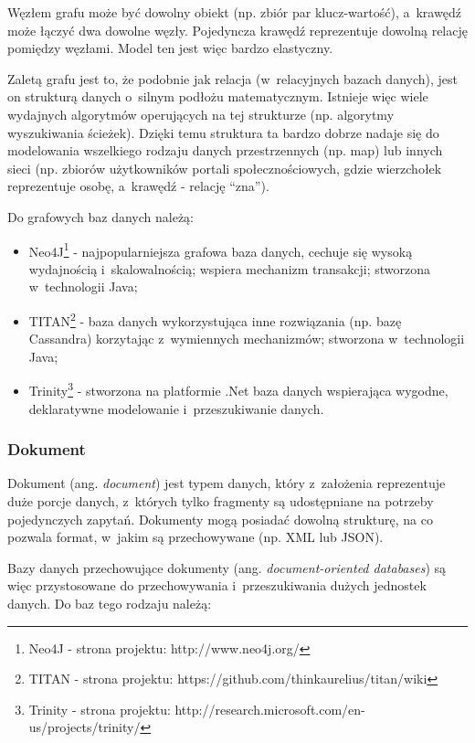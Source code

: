 Węzłem grafu może być dowolny obiekt (np. zbiór par klucz-wartość), a~krawędź może łączyć dwa dowolne węzły.
Pojedyncza krawędź reprezentuje dowolną relację pomiędzy węzłami.
Model ten jest więc bardzo elastyczny.

Zaletą grafu jest to, że podobnie jak relacja (w~relacyjnych bazach danych), jest on strukturą danych o~silnym podłożu matematycznym.
Istnieje więc wiele wydajnych algorytmów operujących na tej strukturze (np. algorytmy wyszukiwania ścieżek).
Dzięki temu struktura ta bardzo dobrze nadaje się do modelowania wszelkiego rodzaju danych przestrzennych (np. map) lub innych sieci (np. zbiorów użytkowników portali społecznościowych, gdzie wierzchołek reprezentuje osobę, a~krawędź - relację ``zna'').

Do grafowych baz danych należą:

\begin{itemize}
 \item Neo4J\footnote{Neo4J - strona projektu: http://www.neo4j.org/} - najpopularniejsza grafowa baza danych, cechuje się wysoką wydajnością i~skalowalnością; wspiera mechanizm transakcji; stworzona w~technologii Java;
 \item TITAN\footnote{TITAN - strona projektu: https://github.com/thinkaurelius/titan/wiki} - baza danych wykorzystująca inne rozwiązania (np. bazę Cassandra) korzytając z~wymiennych mechanizmów; stworzona w~technologii Java;
 \item Trinity\footnote{Trinity - strona projektu: http://research.microsoft.com/en-us/projects/trinity/} - stworzona na platformie .Net baza danych wspierająca wygodne, deklaratywne modelowanie i~przeszukiwanie danych.
\end{itemize}

\subsubsection{Dokument}

Dokument (ang. \emph{document}) jest typem danych, który z~założenia reprezentuje duże porcje danych, z~których tylko fragmenty są udostępniane na potrzeby pojedynczych zapytań.
Dokumenty mogą posiadać dowolną strukturę, na co pozwala format, w~jakim są przechowywane (np. XML lub JSON).

Bazy danych przechowujące dokumenty (ang. \emph{document-oriented databases}) są więc przystosowane do przechowywania i~przeszukiwania dużych jednostek danych.
Do baz tego rodzaju należą:

